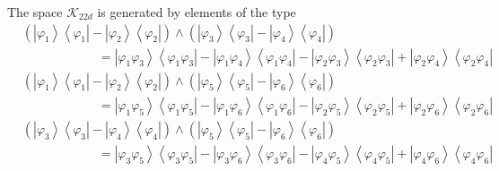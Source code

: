 \documentclass[aps,preprint]{revtex4}%
\begin{document}
The space $\mathcal{K}_{22d}$ is generated by elements of the type
\begin{align}
&  \left(  \left\vert \varphi_{1}\right\rangle \left\langle \varphi
_{1}\right\vert -\left\vert \varphi_{2}\right\rangle \left\langle \varphi
_{2}\right\vert \right)  \wedge\left(  \left\vert \varphi_{3}\right\rangle
\left\langle \varphi_{3}\right\vert -\left\vert \varphi_{4}\right\rangle
\left\langle \varphi_{4}\right\vert \right) \nonumber\\
&  \qquad\qquad\qquad=\left\vert \varphi_{1}\varphi_{3}\right\rangle
\left\langle \varphi_{1}\varphi_{3}\right\vert -\left\vert \varphi_{1}%
\varphi_{4}\right\rangle \left\langle \varphi_{1}\varphi_{4}\right\vert
-\left\vert \varphi_{2}\varphi_{3}\right\rangle \left\langle \varphi
_{2}\varphi_{3}\right\vert +\left\vert \varphi_{2}\varphi_{4}\right\rangle
\left\langle \varphi_{2}\varphi_{4}\right\vert \nonumber\\
&  \left(  \left\vert \varphi_{1}\right\rangle \left\langle \varphi
_{1}\right\vert -\left\vert \varphi_{2}\right\rangle \left\langle \varphi
_{2}\right\vert \right)  \wedge\left(  \left\vert \varphi_{5}\right\rangle
\left\langle \varphi_{5}\right\vert -\left\vert \varphi_{6}\right\rangle
\left\langle \varphi_{6}\right\vert \right) \nonumber\\
&  \qquad\qquad\qquad=\left\vert \varphi_{1}\varphi_{5}\right\rangle
\left\langle \varphi_{1}\varphi_{5}\right\vert -\left\vert \varphi_{1}%
\varphi_{6}\right\rangle \left\langle \varphi_{1}\varphi_{6}\right\vert
-\left\vert \varphi_{2}\varphi_{5}\right\rangle \left\langle \varphi
_{2}\varphi_{5}\right\vert +\left\vert \varphi_{2}\varphi_{6}\right\rangle
\left\langle \varphi_{2}\varphi_{6}\right\vert \nonumber\\
&  \left(  \left\vert \varphi_{3}\right\rangle \left\langle \varphi
_{3}\right\vert -\left\vert \varphi_{4}\right\rangle \left\langle \varphi
_{4}\right\vert \right)  \wedge\left(  \left\vert \varphi_{5}\right\rangle
\left\langle \varphi_{5}\right\vert -\left\vert \varphi_{6}\right\rangle
\left\langle \varphi_{6}\right\vert \right) \nonumber\\
&  \qquad\qquad\qquad=\left\vert \varphi_{3}\varphi_{5}\right\rangle
\left\langle \varphi_{3}\varphi_{5}\right\vert -\left\vert \varphi_{3}%
\varphi_{6}\right\rangle \left\langle \varphi_{3}\varphi_{6}\right\vert
-\left\vert \varphi_{4}\varphi_{5}\right\rangle \left\langle \varphi
_{4}\varphi_{5}\right\vert +\left\vert \varphi_{4}\varphi_{6}\right\rangle
\left\langle \varphi_{4}\varphi_{6}\right\vert \nonumber\\

\end{align}
\end{document}
